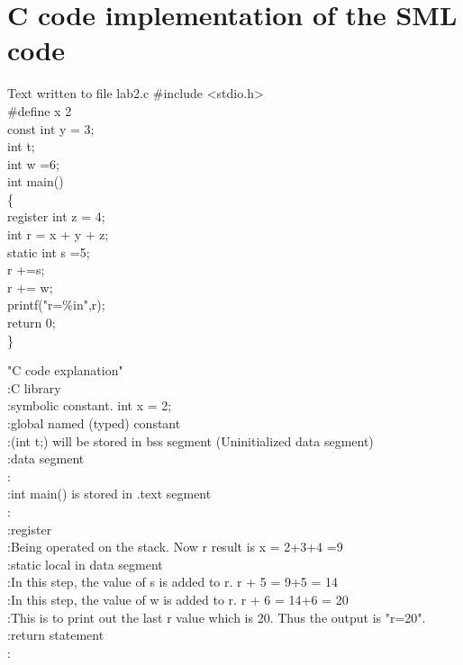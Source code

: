 \documentclass{article}
\begin{document}
\section*{C code implementation of the SML code}
\begin{minipage}{4cm}
\begin{GFT}{Text written to file lab2.c}
\+\#include <stdio.h>\\
\+\#define x 2 		\\
\+const int y = 3;	\\
\+int t; 			\\
\+int w =6; 		\\
\+int main()\\
\+\{\\
\+  register int z = 4;	\\
\+  int r = x + y + z;	\\
\+  static int s =5; 	\\
\+  r +=s;\\
\+  r += w;\\
\+  printf("r=\%i\Backslash{}n",r);	\\
\+  return 0;		\\
\+\}\\
\end{GFT}
\end{minipage}
\begin{minipage}{10cm}
"C code explanation"\\
:C library \\
:symbolic constant. int x = 2; \\
:global named (typed) constant\\
:(int t;) will be stored in bss segment (Uninitialized data segment)\\
:data segment\\
:\\
:int main() is stored in .text segment\\
:\\
:register \\
:Being operated on the stack. Now r result is x = 2+3+4 =9 \\
:static local in data segment \\
:In this step, the value of s is added to r. r + 5 = 9+5 = 14 \\
:In this step, the value of w is added to r. r + 6 = 14+6 = 20 \\
:This is to print out the last r value which is 20. Thus the output is "r=20".\\
:return statement\\	
:\\
\end{minipage}
\end{document}
